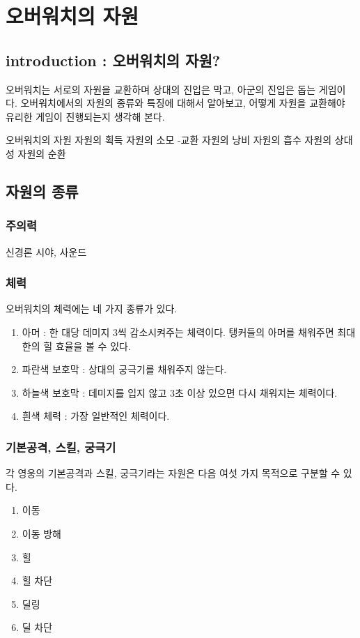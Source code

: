  \chapter{오버워치의 자원}{\label{sec:res}}
\section{introduction : 오버워치의 자원?}\label{res:intro}
오버워치는 서로의 자원을 교환하며 상대의 진입은 막고, 아군의 진입은 돕는 게임이다. 오버워치에서의 자원의 종류와 특징에 대해서 알아보고, 어떻게 자원을 교환해야 유리한 게임이 진행되는지 생각해 본다.

오버워치의 자원
자원의 획득
자원의 소모 -교환
자원의 낭비
자원의 흡수
자원의 상대성
자원의 순환



\section{자원의 종류}
\subsection{주의력}
신경론
시야, 사운드
\subsection{체력}
오버워치의 체력에는 네 가지 종류가 있다.
\begin{enumerate}
    \item 아머 : 한 대당 데미지 3씩 감소시켜주는 체력이다. 탱커들의 아머를 채워주면 최대한의 힐 효율을 볼 수 있다.
    \item 파란색 보호막 : 상대의 궁극기를 채워주지 않는다.
    \item 하늘색 보호막 : 데미지를 입지 않고 3초 이상 있으면 다시 채워지는 체력이다.
    \item 흰색 체력 : 가장 일반적인 체력이다.
    
\end{enumerate}
\subsection{기본공격, 스킬, 궁극기}
각 영웅의 기본공격과 스킬, 궁극기라는 자원은 다음 여섯 가지 목적으로 구분할 수 있다.
\begin{enumerate}
    \item 이동
    \item 이동 방해
    \item 힐
    \item 힐 차단
    \item 딜링
    \item 딜 차단
\end{enumerate}
